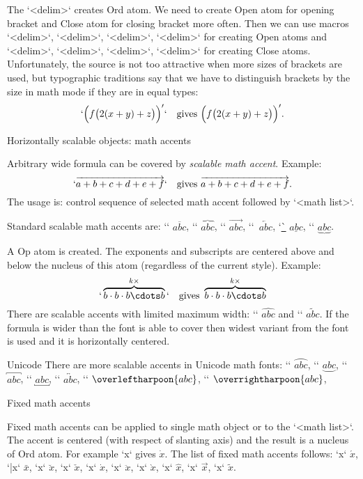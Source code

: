 The `\big<delim>` creates Ord atom. We need to create Open atom
for opening bracket and Close atom for closing bracket more often. 
Then we can use macros
`\bigl<delim>`, 
`\Bigl<delim>`, 
`\biggl<delim>`, 
`\Biggl<delim>` for creating Open atoms and
`\bigr<delim>`, 
`\Bigr<delim>`, 
`\biggr<delim>`, 
`\Biggr<delim>` for creating Close atoms. Unfortunately, the source is not
too attractive when more sizes of brackets are used, but typographic
traditions say that we have to distinguish brackets by the size in math
mode if they are in equal types:
$$
  `\Bigl( f\bigl( 2(x+y) + z\bigr) \Bigr)'` \quad \hbox{gives }
  \Bigl(f\bigl(2(x+y)+z\bigr)\Bigr)'. 
$$

\secc Horizontally scalable objects: math accents

Arbitrary wide formula can be covered by {\em scalable math accent}.
Example:
$$
  `\overrightarrow {a+b+c+d+e+f}` \quad \hbox{gives } \overrightarrow {a+b+c+d+e+f}.
$$
The usage is: control sequence of selected math accent followed by `{<math list>}`.

Standard scalable math accents are: 
`\overline` $\overline{abc}$, 
`\overbrace` $\overbrace{abc}$,
`\overrightarrow` $\overrightarrow{abc}$,
`\overleftarrow`~$\overleftarrow{abc}$, 
`\underline` $\underline{abc}$,
`\underbrace` $\underbrace{abc}$.

A Op atom is created. The exponents and subscripts are centered above
and below the nucleus of this atom (regardless of the current style). Example:
$$
  `\overbrace {b\cdot b\cdot b \cdots b}^{k\times}` \quad \hbox{gives }
  \overbrace {b\cdot b\cdot b \cdots b}^{k\times}
$$
There are scalable accents with limited maximum width:
`\widehat` $\widehat{abc}$ and `\widetilde` $\widetilde{abc}$. If the
formula is wider than the font is able to cover then widest variant from the
font is used and it is horizontally centered.

\new Unicode
There are more scalable accents in Unicode math fonts:
`\overparen` $\overparen{abc}$, `\underparen` $\underparen{abc}$,
`\overbracket` $\overbracket{abc}$, `\underbracket` $\underbracket{abc}$,
`\overleftrightarrow` $\overleftrightarrow{abc}$,
`\overleftharpoon` $\overleftharpoon{abc}$,
`\overrightharpoon` $\overrightharpoon{abc}$,


\secc Fixed math accents

Fixed math accents can be applied to single math object or to the `{<math list>}`. 
The accent is centered (with respect of slanting axis) and the result is a
nucleus of Ord
atom. For example `\dot x` gives $\dot x$. The list of fixed math accents
follows: `\acute x` $\acute x$, `\bar x` $\bar x$, 
`\breve x` $\breve x$, `\check x` $\check x$,
`\dot x` $\dot x$, `\ddot x` $\ddot x$, 
`\grave x` $\grave x$, `\hat x` $\hat x$, 
`\vec x` $\vec x$, `\tilde x` $\tilde x$.

